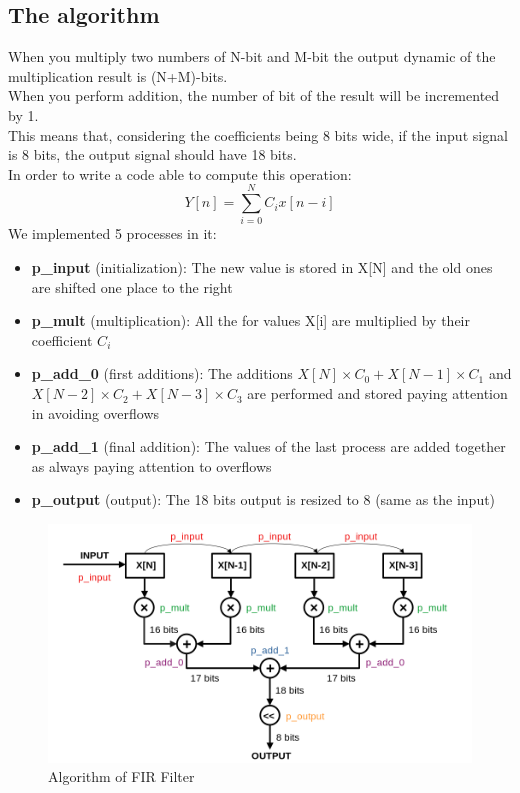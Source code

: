\documentclass[11pt,a4paper,twocolumn]{IEEEtran}
\begin{document}
	\subsection*{The algorithm}
	When you multiply two numbers of N-bit and M-bit the output dynamic of the multiplication result is (N+M)-bits.\\
	When you perform addition, the number of bit of the result will be incremented by 1.\\
	This means that, considering the coefficients being 8 bits wide, if the input signal is 8 bits, the output signal should have 18 bits.\\
	In order to write a code able to compute this operation:
	$$ Y[n] = \sum_{i=0}^N C_i x[n-i] $$
	We implemented 5 processes in it:
	\begin{itemize}
	\item\textbf{p\_input} (initialization): The new value is stored in X[N] and the old ones are shifted one place to the right
	\item\textbf{p\_mult} (multiplication): All the for values X[i] are multiplied by their coefficient $C_i$
	\item\textbf{p\_add\_0} (first additions): The additions $X[N]\times C_0 + X[N-1]\times C_1$ and $X[N-2]\times C_2 + X[N-3]\times C_3$ are performed and stored paying attention in avoiding overflows
	\item\textbf{p\_add\_1} (final addition): The values of the last process are added together as always paying attention to overflows
	\item\textbf{p\_output} (output): The 18 bits output is resized to 8 (same as the input)
	\end{itemize}
\begin{figure}[h]
	\hspace*{-1cm}
	\includegraphics[width=1.2\linewidth]{img/firalg1}
	\caption{Algorithm of FIR Filter}
\end{figure}
\end{document}
